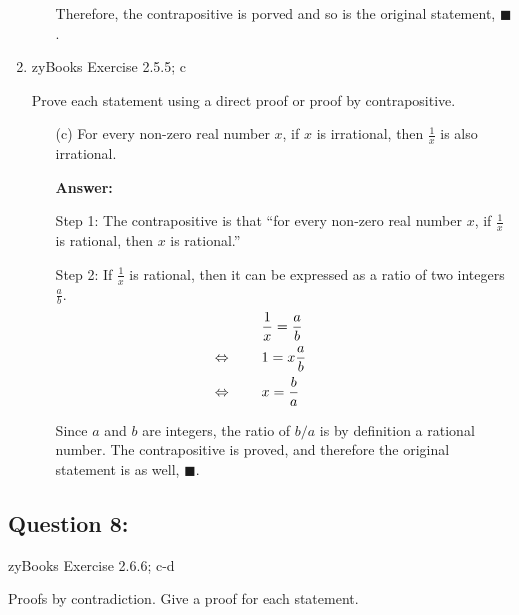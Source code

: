 \documentclass[14pt]{extreport}
\newcommand{\eq}[0]{\llap{\( \Leftrightarrow \) \qquad}}
\newcommand{\answer}[0]{\medskip \textbf{Answer:} \medskip}
\begin{document}
\begin{enumerate}
\begin{enumerate}
                Therefore, the contrapositive is porved and so is the original statement, \( \blacksquare \).
        \end{enumerate}

    \item zyBooks Exercise 2.5.5; c
    
    Prove each statement using a direct proof or proof by contrapositive.
    
        \begin{enumerate}
            
            \item[(c)] For every non-zero real number \( x \), if \( x \) is irrational, then \( \frac{1}{x} \) is also irrational.
            
                \answer

                Step 1: The contrapositive is that ``for every non-zero real number \( x \), if \( \frac{1}{x} \) is rational, then \( x \) is rational.''

                \medskip

                Step 2: If \( \frac{1}{x} \) is rational, then it can be expressed as a ratio of two integers \( \frac{a}{b} \).
                \begin{align*}
                    & \frac{1}{x} = \frac{a}{b} \\
                    &\eq 1 = x \frac{a}{b} \\
                    &\eq x = \frac{b}{a}
                \end{align*}

                Since \( a \) and \( b \) are integers, the ratio of \( b/a \) is by definition a rational number. The contrapositive is proved, and therefore the original statement is as well, \( \blacksquare \).
        \end{enumerate}

\end{enumerate}
\newpage

\subsection*{Question 8:}

zyBooks Exercise 2.6.6; c-d


Proofs by contradiction. Give a proof for each statement.
\end{document}
